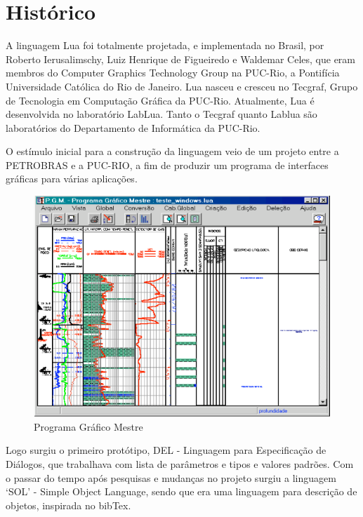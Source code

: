\documentclass[
12pt, %
openright, %
oneside, %
a4paper, %
english, %
brazil, %
]{abntex2}
\begin{document}





\chapter{Histórico}
A linguagem Lua foi totalmente projetada, e implementada no Brasil, por Roberto Ierusalimschy, Luiz Henrique de Figueiredo e Waldemar Celes, que eram membros do Computer Graphics Technology Group na PUC-Rio, a Pontifícia Universidade Católica do Rio de Janeiro. Lua nasceu e cresceu no Tecgraf, Grupo de Tecnologia em Computação Gráfica da PUC-Rio. Atualmente, Lua é desenvolvida no laboratório LabLua. Tanto o Tecgraf quanto Lablua são laboratórios do Departamento de Informática da PUC-Rio.

O estímulo inicial para a construção da linguagem veio de um projeto entre a PETROBRAS e a PUC-RIO, a fim de produzir um programa de interfaces gráficas para várias aplicações.

\begin{figure}[H]
\centering
\includegraphics[width=0.5\linewidth]{imagens/imagem1.png}
\caption{Programa Gráfico Mestre}
\end{figure}

Logo surgiu o primeiro protótipo, DEL - Linguagem para Especificação de Diálogos, que trabalhava com lista de parâmetros e tipos e valores padrões. Com o passar do tempo após pesquisas e mudanças no projeto surgiu a linguagem `SOL' - Simple Object Language, sendo que era uma linguagem para descrição de objetos, inspirada no bibTex.
\end{document}
